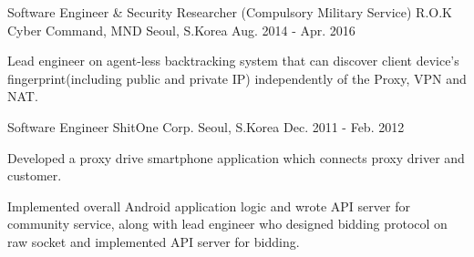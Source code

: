 \begin{cventries}
  \cventry
    {Software Engineer \& Security Researcher (Compulsory Military Service)} %
    {R.O.K Cyber Command, MND} %
    {Seoul, S.Korea} %
    {Aug. 2014 - Apr. 2016} %
    {
      \begin{cvitems} %
        \item {Lead engineer on agent-less backtracking system that can discover client device's fingerprint(including public and private IP) independently of the Proxy, VPN and NAT.}
      \end{cvitems}
    }

  \cventry
    {Software Engineer} %
    {ShitOne Corp.} %
    {Seoul, S.Korea} %
    {Dec. 2011 - Feb. 2012} %
    {
      \begin{cvitems} %
        \item {Developed a proxy drive smartphone application which connects proxy driver and customer.}
        \item {Implemented overall Android application logic and wrote API server for community service, along with lead engineer who designed bidding protocol on raw socket and implemented API server for bidding.}
      \end{cvitems}
    }

\end{cventries}
